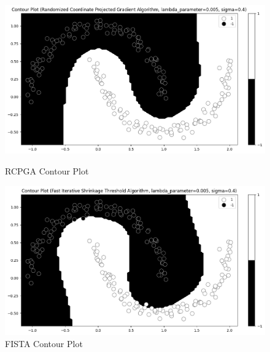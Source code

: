 \documentclass[12pt]{article}
\begin{document}
\begin{figure}[h]
\centering
\begin{minipage}{.5\textwidth}
  \centering
\includegraphics[scale=0.35]{outputs/part_4/rcpga-contour}
\caption{RCPGA Contour Plot}
\label{fig:}
\end{minipage}%
\begin{minipage}{.5\textwidth}
  \centering
\includegraphics[scale=0.35]{outputs/part_4/fista-contour}
\caption{FISTA Contour Plot}
\label{fig:}
\end{minipage}
\end{figure}
\end{document}
